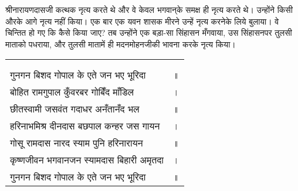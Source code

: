 \begin{sloppypar}\justifying{}
श्रीनारायणदासजी कत्थक नृत्य करते थे और वे केवल भगवान्‌के समक्ष ही नृत्य करते थे। उन्होंने किसी औरके आगे नृत्य नहीं किया। एक बार एक यवन शासक मीरने उन्हें नृत्य करनेके लिये बुलाया। वे चिन्तित हो गए कि कैसे किया जाए? तब उन्होंने एक बड़ा-सा सिंहासन मँगवाया, उस सिंहासनपर तुलसी माताको पधराया, और तुलसी मातामें ही मदनमोहनजीकी भावना करके नृत्य किया।
\end{sloppypar}


{
{\bfseries
\setlength{\mylenone}{0pt}
\settowidth{\mylentwo}{}
\setlength{\mylenone}{\maxof{\mylenone}{\mylentwo}}
\settowidth{\mylentwo}{गुनगन बिशद गोपाल के एते जन भए भूरिदा}
\setlength{\mylenone}{\maxof{\mylenone}{\mylentwo}}
\settowidth{\mylentwo}{बोहित रामगुपाल कुँवरबर गोबिँद माँडिल}
\setlength{\mylenone}{\maxof{\mylenone}{\mylentwo}}
\settowidth{\mylentwo}{छीतस्वामी जसवंत गदाधर अनँतानँद भल}
\setlength{\mylenone}{\maxof{\mylenone}{\mylentwo}}
\settowidth{\mylentwo}{हरिनाभमिश्र दीनदास बछपाल कन्हर जस गायन}
\setlength{\mylenone}{\maxof{\mylenone}{\mylentwo}}
\settowidth{\mylentwo}{गोसू रामदास नारद स्याम पुनि हरिनारायन}
\setlength{\mylenone}{\maxof{\mylenone}{\mylentwo}}
\settowidth{\mylentwo}{कृष्णजीवन भगवानजन स्यामदास बिहारी अमृतदा}
\setlength{\mylenone}{\maxof{\mylenone}{\mylentwo}}
\settowidth{\mylentwo}{गुनगन बिशद गोपाल के एते जन भए भूरिदा}
\setlength{\mylenone}{\maxof{\mylenone}{\mylentwo}}
\setlength{\mylentwo}{\baselineskip}
\setlength{\mylenone}{\mylenone + 1pt}
\begin{longtable}[l]{@{\hspace*{\mylen}}>{\setlength\parfillskip{0pt}}p{\mylenone}@{}@{}l@{}}
 & \\[-\the\mylentwo]
\centering{॥ १४६ \hspace*{-1.5mm}॥} & \\ \nopagebreak
गुनगन बिशद गोपाल के एते जन भए भूरिदा & ॥\\
बोहित रामगुपाल कुँवरबर गोबिँद माँडिल & ।\\ \nopagebreak
छीतस्वामी जसवंत गदाधर अनँतानँद भल & ॥\\
हरिनाभमिश्र दीनदास बछपाल कन्हर जस गायन & ।\\ \nopagebreak
गोसू रामदास नारद स्याम पुनि हरिनारायन & ॥\\
कृष्णजीवन भगवानजन स्यामदास बिहारी अमृतदा & ।\\ \nopagebreak
गुनगन बिशद गोपाल के एते जन भए भूरिदा & ॥
\end{longtable}
}
}
